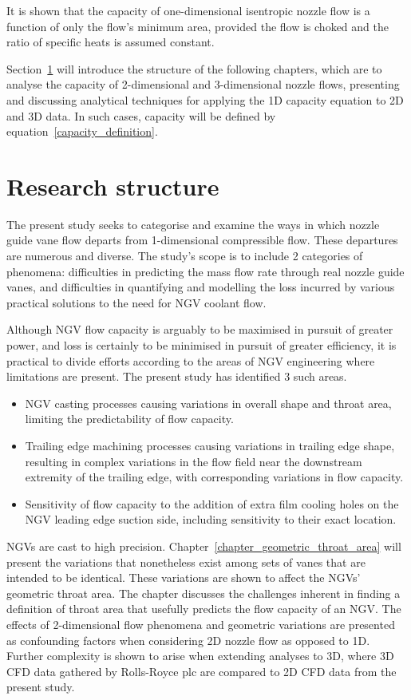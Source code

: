 \documentclass[a4paper, 11pt, oneside]{report}
\begin{document}
It is shown that the capacity of one-dimensional isentropic nozzle flow is a function of only the flow's minimum area, provided the flow is choked and the ratio of specific heats is assumed constant. 

Section~\ref{research_structure} will introduce the structure of the following chapters, which are to analyse the capacity of 2-dimensional and 3-dimensional nozzle flows, presenting and discussing analytical techniques for applying the 1D capacity equation to 2D and 3D data. In such cases, capacity will be defined by equation~\ref{capacity_definition}.


\section{Research structure}
\label{research_structure}

The present study seeks to categorise and examine the ways in which nozzle guide vane flow departs from 1-dimensional compressible flow. These departures are numerous and diverse. The study's scope is to include 2 categories of phenomena: difficulties in predicting the mass flow rate through real nozzle guide vanes, and difficulties in quantifying and modelling the loss incurred by various practical solutions to the need for NGV coolant flow.

Although NGV flow capacity is arguably to be maximised in pursuit of greater power, and loss is certainly to be minimised in pursuit of greater efficiency, it is practical to divide efforts according to the areas of NGV engineering where limitations are present. The present study has identified 3 such areas.
\begin{itemize}
	\item NGV casting processes causing variations in overall shape and throat area, limiting the predictability of flow capacity.
	\item Trailing edge machining processes causing variations in trailing edge shape, resulting in complex variations in the flow field near the downstream extremity of the trailing edge, with corresponding variations in flow capacity.
	\item Sensitivity of flow capacity to the addition of extra film cooling holes on the NGV leading edge suction side, including sensitivity to their exact location.
\end{itemize}

NGVs are cast to high precision. Chapter~\ref{chapter_geometric_throat_area} will present the variations that nonetheless exist among sets of vanes that are intended to be identical. These variations are shown to affect the NGVs' geometric throat area. The chapter discusses the challenges inherent in finding a definition of throat area that usefully predicts the flow capacity of an NGV. The effects of 2-dimensional flow phenomena and geometric variations are presented as confounding factors when considering 2D nozzle flow as opposed to 1D. Further complexity is shown to arise when extending analyses to 3D, where 3D CFD data gathered by Rolls-Royce plc are compared to 2D CFD data from the present study.
\end{document}
